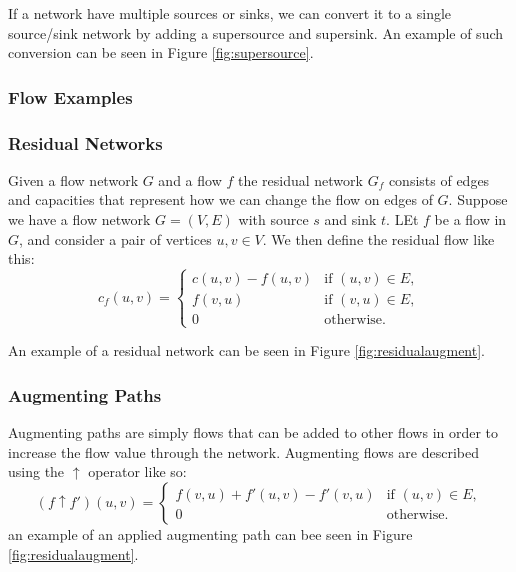 If a network have multiple sources or sinks, we can convert it to a single
source/sink network by adding a supersource and supersink. An example of such
conversion can be seen in Figure \ref{fig:supersource}.

\subsubsection{Flow Examples}

\subsubsection{Residual Networks}
Given a flow network $G$ and a flow $f$ the residual network $G_f$ consists of
edges and capacities that represent how we can change the flow on edges of $G$.
Suppose we have a flow network $G=(V,E)$ with source $s$ and sink $t$. LEt $f$
be a flow in $G$, and consider a pair of vertices $u,v \in V$. We then define
the residual flow like this:
\[
  c_f(u,v) =
  \begin{cases}
    c(u,v) - f(u,v) & \text{if } (u,v) \in E, \\
    f(v,u)          & \text{if } (v,u) \in E, \\
    0               & \text{otherwise}.
  \end{cases}
\]


An example of a residual network can be seen in Figure
\ref{fig:residualaugment}.


\subsubsection{Augmenting Paths}
Augmenting paths are simply flows that can be added to other flows in order to
increase the flow value through the network. Augmenting flows are described
using the $\uparrow$ operator like so:
\[
  (f\uparrow f')(u,v) =
  \begin{cases}
    f(v,u)+f'(u,v) - f'(v,u) & \text{if } (u,v) \in E, \\
    0                        & \text{otherwise}.
  \end{cases}
\]
an example of an applied augmenting path can bee seen in Figure
\ref{fig:residualaugment}.


